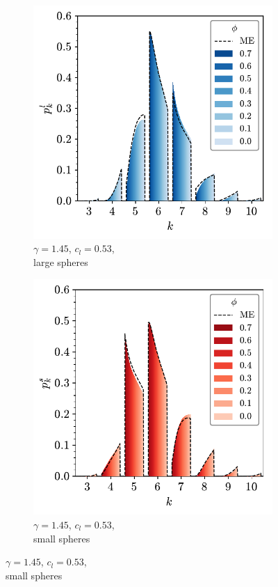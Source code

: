 \begin{figure}[bt]
     \centering
     
      \begin{subfigure}[b]{0.45\textwidth}
         \centering
         \includegraphics[width=\textwidth]{./figures/quasi2d/phi_me_l_53.pdf}
         \caption{$\gamma=1.45$, $c_l=0.53$, \\large spheres}
         \label{fig:bime1}
     \end{subfigure}
     \hfill
      \begin{subfigure}[b]{0.45\textwidth}
         \centering
         \includegraphics[width=\textwidth]{./figures/quasi2d/phi_me_s_53.pdf}
         \caption{$\gamma=1.45$, $c_l=0.53$,\\ small spheres}
         \label{fig:bime2}
     \end{subfigure}
     \hfill
     

\end{figure}

